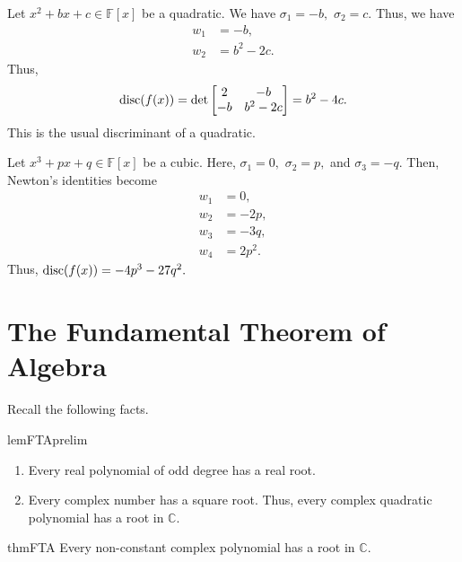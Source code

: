 \begin{ex}
    Let $x^2 + bx + c \in \mathbb{F}[x]$ be a quadratic. We have $\sigma_1 = -b,$ $\sigma_2 = c.$ Thus, we have
    \begin{align*} 
        w_1 &= -b,\\
        w_2 &= b^2 - 2c.
    \end{align*}
    Thus,
    \begin{equation*} 
        \operatorname{disc}(f(x)) = \det\begin{bmatrix}
            2 & -b\\
            -b & b^2 - 2c
        \end{bmatrix} = b^2 - 4c.
    \end{equation*}
    This is the usual discriminant of a quadratic.
\end{ex}

\begin{ex} \label{ex:disccubic}
    Let $x^3 + px + q \in \mathbb{F}[x]$ be a cubic. Here, $\sigma_1 = 0,$ $\sigma_2 = p,$ and $\sigma_3 = -q.$ Then, Newton's identities become
    \begin{align*} 
        w_1 &= 0,\\
        w_2 &= -2p,\\
        w_3 &= -3q,\\
        w_4 &= 2p^2.
    \end{align*}
    Thus, $\operatorname{disc}(f(x)) = -4p^3 - 27q^2.$
\end{ex}

\section{The Fundamental Theorem of Algebra}

Recall the following facts.

\begin{restatable}[]{lem}{FTAprelim}
\label{lem:FTAprelim}
    \phantom{hi}
    \begin{enumerate}
        \item Every real polynomial of odd degree has a real root.
        \item Every complex number has a square root. Thus, every complex quadratic polynomial has a root in $\mathbb{C}.$ \hfill\hyperref[lem:FTAprelim2]{\downsym}
    \end{enumerate} 
\end{restatable}

\begin{restatable}{thm}{FTA}
\label{thm:FTA}
    Every non-constant complex polynomial has a root in $\mathbb{C}.$ \hfill\hyperref[thm:FTA2]{\downsym}
\end{restatable}
